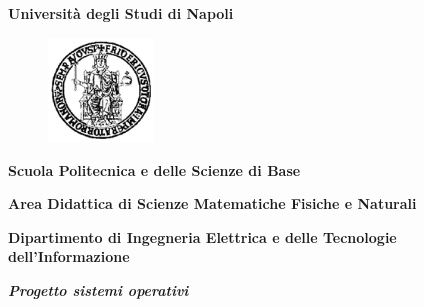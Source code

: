 \documentclass[a4paper,12pt,openright,oneside]{book}
\begin{document}
 
\begin{titlepage}


\begin{center}
    {\bfseries\Huge Università degli Studi di Napoli\\}
\end{center} 

\begin{figure}[h]
    \begin{center}
        
\includegraphics[width=0.25\textwidth]{fiilogo.png}    %
    \end{center}
\end{figure}
  
\begin{center}
    \bf{Scuola Politecnica e delle Scienze di Base}
\end{center}
\begin{center}
    \bf{Area Didattica di Scienze Matematiche Fisiche e Naturali}
\end{center}
\vspace{5pt}
\begin{center}
    \textbf{Dipartimento di Ingegneria Elettrica e delle Tecnologie dell'Informazione}
\end{center}
\vspace{40pt}
\begin{center}
    {\emph{\Large{\bf{Progetto sistemi operativi}}}}\\
    
\end{center}
\vspace{15pt}



\end{titlepage}
\end{document}
